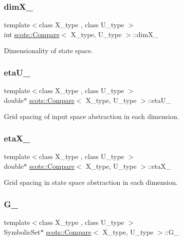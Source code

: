\subsubsection{\texorpdfstring{dim\+X\+\_\+}{dimX\_}}
{\footnotesize\ttfamily template$<$class X\+\_\+type , class U\+\_\+type $>$ \\
int \hyperlink{classscots_1_1Compare}{scots\+::\+Compare}$<$ X\+\_\+type, U\+\_\+type $>$\+::dim\+X\+\_\+}

Dimensionality of state space. \mbox{\label{classscots_1_1Compare_a5bc5261e5403a3e984020cd8b05b587a}} 
\subsubsection{\texorpdfstring{eta\+U\+\_\+}{etaU\_}}
{\footnotesize\ttfamily template$<$class X\+\_\+type , class U\+\_\+type $>$ \\
double$\ast$ \hyperlink{classscots_1_1Compare}{scots\+::\+Compare}$<$ X\+\_\+type, U\+\_\+type $>$\+::eta\+U\+\_\+}

Grid spacing of input space abstraction in each dimension. \mbox{\label{classscots_1_1Compare_ae5fae0a0ea064b629885b69cc32014d1}} 
\subsubsection{\texorpdfstring{eta\+X\+\_\+}{etaX\_}}
{\footnotesize\ttfamily template$<$class X\+\_\+type , class U\+\_\+type $>$ \\
double$\ast$ \hyperlink{classscots_1_1Compare}{scots\+::\+Compare}$<$ X\+\_\+type, U\+\_\+type $>$\+::eta\+X\+\_\+}

Grid spacing in state space abstraction in each dimension. \mbox{\label{classscots_1_1Compare_a1a7d912c19ff01269353ec705a257ad6}} 
\subsubsection{\texorpdfstring{G\+\_\+}{G\_}}
{\footnotesize\ttfamily template$<$class X\+\_\+type , class U\+\_\+type $>$ \\
Symbolic\+Set$\ast$ \hyperlink{classscots_1_1Compare}{scots\+::\+Compare}$<$ X\+\_\+type, U\+\_\+type $>$\+::G\+\_\+}

